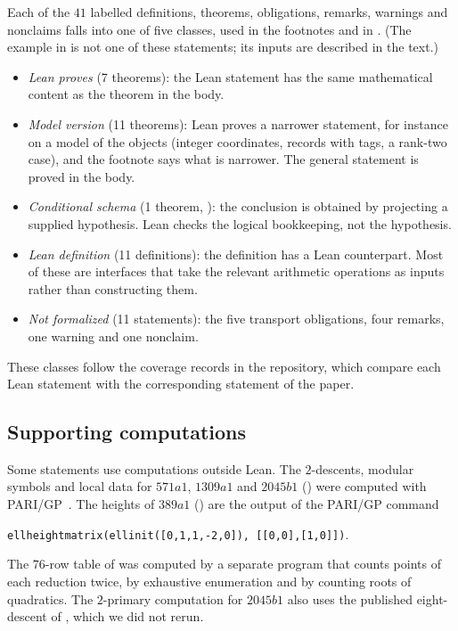 \documentclass[11pt]{article}
\theoremstyle{definition}
\begin{document}
Each of the $41$ labelled definitions, theorems, obligations, remarks,
warnings and nonclaims falls into one of five classes, used in the
footnotes and in .  (The example in
 is not one of these statements; its inputs are
described in the text.)
\begin{itemize}
\item \emph{Lean proves} (7 theorems): the Lean statement has the same
  mathematical content as the theorem in the body.
\item \emph{Model version} (11 theorems): Lean proves a narrower statement,
  for instance on a model of the objects (integer coordinates, records
  with tags, a rank-two case), and the footnote says what is narrower.  The
  general statement is proved in the body.
\item \emph{Conditional schema} (1 theorem, ):
  the conclusion is obtained by projecting a supplied hypothesis.  Lean
  checks the logical bookkeeping, not the hypothesis.
\item \emph{Lean definition} (11 definitions): the definition has a Lean
  counterpart.  Most of these are interfaces that take the relevant
  arithmetic operations as inputs rather than constructing them.
\item \emph{Not formalized} (11 statements): the five transport
  obligations, four remarks, one warning and one nonclaim.
\end{itemize}
These classes follow the coverage records in the repository, which compare
each Lean statement with the corresponding statement of the paper.

\subsection*{Supporting computations}

Some statements use computations outside Lean.  The $2$-descents,
modular symbols and local data for $571a1$, $1309a1$ and $2045b1$
() were computed with
PARI/GP~\citep{PARI2023}.  The heights of $389a1$
() are the output of the PARI/GP command
\begin{center}
\texttt{ellheightmatrix(ellinit([0,1,1,-2,0]), [[0,0],[1,0]])}.
\end{center}
The
$76$-row table of  was computed by
a separate program that counts points of each reduction twice, by
exhaustive enumeration and by counting roots of quadratics.  The
$2$-primary computation for $2045b1$ also uses the published
eight-descent of \citet[proof of Theorem~7.1]{Miller2011}, which we did
not rerun.
\end{document}
